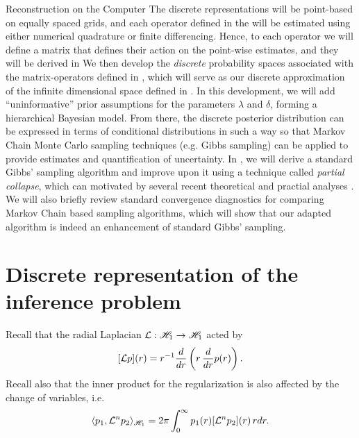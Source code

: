 \begin{chapter}{Reconstruction on the Computer}
The discrete representations will be point-based on equally spaced grids, and each operator defined in the  will be estimated using either numerical quadrature or finite differencing.
Hence, to each operator we will define a matrix that defines their action on the point-wise estimates, and they will be derived in 
We then develop the \emph{discrete} probability spaces associated with the matrix-operators defined in , which will serve as our discrete approximation of the infinite dimensional space defined in .
In this development, we will add ``uninformative'' prior assumptions for the parameters $\lambda$ and $\delta$, forming a hierarchical Bayesian model.
From there, the discrete posterior distribution can be expressed in terms of conditional distributions in such a way so that Markov Chain Monte Carlo sampling techniques (e.g. Gibbs sampling) can be applied to provide estimates and quantification of uncertainty.
In , we will derive a standard Gibbs' sampling algorithm \cite{geman1984stochastic} and improve upon it using a technique called \emph{partial collapse}, which can motivated by several recent theoretical and practial analyses \citep{van2008partially,agapiou2014analysis,fox2015fast}.
We will also briefly review standard convergence diagnostics for comparing Markov Chain based sampling algorithms, which will show that our adapted algorithm is indeed an enhancement of standard Gibbs' sampling.

\section{Discrete representation of the inference problem} \label{sec:discretization}

Recall that the radial Laplacian $\mathcal L: \mathscr H_1 \to \mathscr H_1$ acted by
\begin{equation} \label{eq:infiniteRadialLaplacian}
  [\mathcal L p](r) = r^{-1}\frac{d}{dr}\left(r \,\frac{d}{dr}p(r)\right). 
\end{equation}
Recall also that the inner product for the regularization is also affected by the change of variables, i.e.
\begin{equation} \label{eq:infiteRadialInnerProduct}
  \langle p_1, \mathcal L^n p_2 \rangle_{\mathscr H_1}
    = 2\pi\int_0^\infty p_1(r) [\mathcal L^n p_2](r) \, rdr. 
\end{equation}


\end{chapter}
